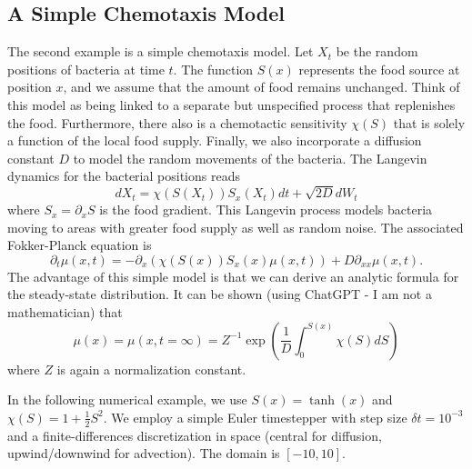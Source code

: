 \documentclass{article}
\begin{document}
\subsection{A Simple Chemotaxis Model}
The second example is a simple chemotaxis model. Let $X_t$ be the random positions of bacteria at time $t$. The function $S(x)$ represents the food source at position $x$, and we assume that the amount of food remains unchanged. Think of this model as being linked to a separate but unspecified process that replenishes the food. Furthermore, there also is a chemotactic sensitivity $\chi(S)$ that is solely a function of the local food supply. Finally, we also incorporate a diffusion constant $D$ to model the random movements of the bacteria. The Langevin dynamics for the bacterial positions reads
\begin{equation}
    dX_t = \chi(S(X_t)) S_x(X_t) dt + \sqrt{2D} dW_t
\end{equation}
where $S_x = \partial_x S$ is the food gradient. This Langevin process models bacteria moving to areas with greater food supply as well as random noise. The associated Fokker-Planck equation is
\begin{equation}
    \partial_t \mu(x,t) = -\partial_x\left(\chi(S(x)) S_x(x) \mu(x,t)\right) + D \partial_{xx} \mu(x,t).
\end{equation}
The advantage of this simple model is that we can derive an analytic formula for the steady-state distribution. It can be shown (using ChatGPT - I am not a mathematician) that 
\begin{equation} \label{eq:chemotaxis_ss}
    \mu(x) = \mu(x,t=\infty) = Z^{-1} \exp\left(\frac{1}{D} \int_{0}^{S(x)} \chi(S) dS\right)
\end{equation}
where $Z$ is again a normalization constant.

In the following numerical example, we use $S(x) = \tanh(x)$ and $\chi(S) = 1 + \frac{1}{2}S^2$. We employ a simple Euler timestepper with step size $\delta t = 10^{-3}$ and a finite-differences discretization in space (central for diffusion, upwind/downwind for advection). The domain is $[-10, 10]$.
\end{document}
